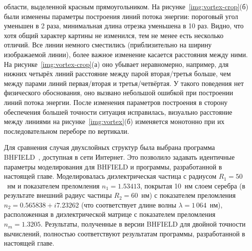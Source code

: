 области, выделенной красным прямоугольником. На
рисунке~\ref{img:vortex-crop}(б) были изменены параметры построения
линий потока энергии: пороговый угол уменьшен в 2 раза, минимальная
длина отрезка уменьшена в 10 раз. Видно, что хотя общий характер
картины не изменился, тем не менее есть несколько отличий. Все линии
немного сместились (приблизительно на ширину изображаемой линии),
более важное изменение касается расстояния между ними. На
рисунке~\ref{img:vortex-crop}(а) оно убывает неравномерно, например,
для нижних четырёх линий расстояние между парой вторая/третья
больше, чем между парами линий первая/вторая и третья/четвёртая. У
такого поведения нет физического обоснования, оно вызвано небольшой
ошибкой при построении линий потока энергии.  После изменения
параметров построения в сторону обеспечения большей точности ситуация
исправилась, визуально расстояние между линиями на
рисунке~\ref{img:vortex}(б) изменяется монотонно при их последовательном
переборе по вертикали.
 
Для сравнения случая двухслойных структур была выбрана программа
BHFIELD~\cite{Suzuki-2008,Suzuki-2013}, доступная в
сети Интернет.  Это позволило задавать идентичные параметры
моделирования для BHFIELD и программы, разработанной в настоящей
главе. Моделировалась диэлектрическая частица с радиусом $R_1=50$~нм и
показателем преломления $n_1=1.53413$, покрытая 10~нм слоем серебра (в
результате внешний радиус частицы $R_2=60$~нм) с показателем
преломления $n_2=0.565838+i7.23262$ (что соответствует длине волны
$\lambda = 1\,064$~нм), расположенная в диэлектрической матрице с
показателем преломления $n_m=1.3205$.  Результаты, полученные в версии
BHFIELD для двойной точности вычислений, полностью соответствуют
результатам программы, разработанной в настоящей главе.

